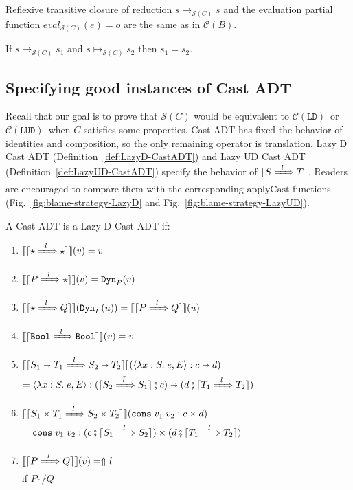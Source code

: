\documentclass[runningheads]{llncs}
\newcommand{\CMachine}[1]{\ensuremath{\mathcal{C}(#1)}}
\newcommand{\LDMachine}{\CMachine{\BLD}}
\newcommand{\LUDMachine}{\CMachine{\BLUD}}
\newcommand{\SMachine}[1]{\ensuremath{\mathcal{S}(#1)}}
\newcommand{\error}[1]{\ensuremath{\Uparrow#1}}
\newcommand{\Tdyn}[0]{\ensuremath{\star}}
\newcommand{\Pbool}[0]{\ensuremath{\mathtt{Bool}}}
\newcommand{\Pfunc}[2]{\ensuremath{#1 \shortrightarrow #2}}
\newcommand{\Pprod}[2]{\ensuremath{#1 \times #2}}
\newcommand{\elam}[3]{\lambda#1:#2.\;#3}
\newcommand{\econs}[2]{\mathtt{cons} \; #1 \; #2}
\newcommand{\ecast}[2]{\ensuremath{#1 : #2}}
\newcommand{\ccast}[3]{#1 \xRightarrow[]{\enskip #2 \enskip} #3}
\newcommand{\vdyn}[2]{\mathtt{Dyn}_{#1}(#2)}
\newcommand{\vfunc}[4]{\langle\elam{#1}{#2}{#3},#4\rangle}
\newcommand{\vcons}[2]{\econs{#1}{#2}}
\newcommand{\BLD}[0]{\ensuremath{\mathtt{LD}}}
\newcommand{\BLUD}[0]{\ensuremath{\mathtt{LUD}}}
\newcommand{\denote}[1]{\ensuremath{\llbracket #1 \rrbracket}}
\newcommand{\compose}[2]{\ensuremath{#1 \fatsemi #2}}
\newcommand{\translate}[1]{\ensuremath{\lceil#1\rceil}}
\newcommand{\notshallowlyconsistent}[2]{\ensuremath{#1\not\smile#2}}
\newcommand{\reducetoS}[3]{\ensuremath{#2 \longmapsto_{\SMachine{#1}} #3}}
\newcommand{\evaltoS}[3]{\ensuremath{\mathit{eval}_{\SMachine{#1}}(#2)=#3}}
\begin{document}
Reflexive transitive closure of reduction $\reducetoS{C}{s}{s}$ and
the evaluation partial function $\evaltoS{C}{e}{o}$ are the same as in \CMachine{B}.

\begin{proposition}[\SMachine{C} is deterministic]
	\label{prop:SEMachine-deterministic}
	If $\reducetoS{C}{s}{s_1}$ and $\reducetoS{C}{s}{s_2}$ 
	then $s_1 = s_2$.
\end{proposition}

\subsection{Specifying good instances of Cast ADT} \label{sec:good-cast-adt}

Recall that our goal is to prove that \SMachine{C} would be equivalent to
\LDMachine\ or \LUDMachine\ when $C$ satisfies some properties.
Cast ADT has fixed the behavior of identities and composition, so the only 
remaining operator is translation.
%
Lazy D Cast ADT (Definition~\ref{def:LazyD-CastADT}) and Lazy UD Cast ADT 
(Definition~\ref{def:LazyUD-CastADT}) specify the behavior 
of \translate{\ccast{S}{l}{T}}. Readers are encouraged to compare them with the 
corresponding $\mathrm{applyCast}$ functions 
(Fig.~\ref{fig:blame-strategy-LazyD} and 
Fig.~\ref{fig:blame-strategy-LazyUD}).

\begin{definition}
	\label{def:LazyD-CastADT}
	A Cast ADT is a Lazy D Cast ADT if:
	\begin{enumerate}
		\item $\denote{\translate{\ccast{\Tdyn}{l}{\Tdyn}}}(v) = v$
		\item $\denote{\translate{\ccast{P}{l}{\Tdyn}}}(v) = \vdyn{P}{v}$
		\item $\denote{\translate{\ccast{\Tdyn}{l}{Q}}}(\vdyn{P}{u}) = 
		\denote{\translate{\ccast{P}{l}{Q}}}(u)$
		\item $\denote{\translate{\ccast{\Pbool}{l}{\Pbool}}}(v) = v$
		\item 
		$\denote{\translate{\ccast{\Pfunc{S_1}{T_1}}{l}{\Pfunc{S_2}{T_2}}}}(
			\ecast{\vfunc{x}{S}{e}{E}}{\Pfunc{c}{d}})$\\
		$=
		\ecast{\vfunc{x}{S}{e}{E}}{
			\Pfunc{
				(\compose{\translate{\ccast{S_2}{\bar{l}}{S_1}}}{c})}{
				(\compose{d}{\translate{\ccast{T_1}{l}{T_2}}})}}$
		\item 
		$\denote{\translate{\ccast{\Pprod{S_1}{T_1}}{l}{\Pprod{S_2}{T_2}}}}(
		\ecast{\vcons{v_1}{v_2}}{\Pprod{c}{d}})$\\
		$=
		\ecast{\vcons{v_1}{v_2}}{
			\Pprod{
				(\compose{c}{\translate{\ccast{S_1}{l}{S_2}}})}{
				(\compose{d}{\translate{\ccast{T_1}{l}{T_2}}})}}$
		\item $\denote{\translate{\ccast{P}{l}{Q}}}(v) = \error{l}$\\
			if $\notshallowlyconsistent{P}{Q}$
	\end{enumerate}
\end{definition}
\end{document}
